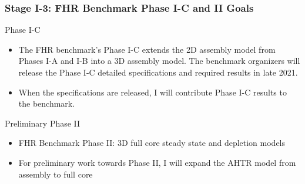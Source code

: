 \begin{frame}
    \frametitle{Stage I-3: FHR Benchmark Phase I-C and II Goals}
    \begin{block}{Phase I-C}
        \begin{itemize}
            \item The FHR benchmark's Phase I-C extends the 2D assembly model from 
            Phases I-A and I-B into a 3D assembly model. The benchmark organizers 
            will release the Phase I-C detailed specifications and required results 
            in late 2021.
            \item When the specifications are released, I will contribute Phase I-C
            results to the benchmark. 
        \end{itemize}
    \end{block}
    \begin{block}{Preliminary Phase II}
        \begin{itemize}
            \item FHR Benchmark Phase II: 3D full core steady state and depletion 
            models 
            \item For preliminary work towards Phase II, I will expand the AHTR model 
            from assembly to full core 
        \end{itemize}
    \end{block}
\end{frame}